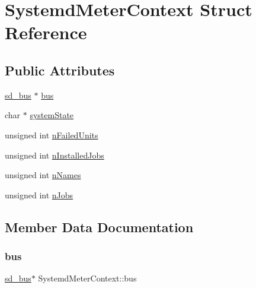 \hypertarget{structSystemdMeterContext}{}\section{Systemd\+Meter\+Context Struct Reference}
\label{structSystemdMeterContext}
\subsection*{Public Attributes}
\begin{DoxyCompactItemize}
\item 
\hyperlink{SystemdMeter_8c_a50445096b835a37bdc1bd416668b969b}{sd\+\_\+bus} $\ast$ \hyperlink{structSystemdMeterContext_acce0c8766cdfc955830c084cc7492b7d}{bus}
\item 
char $\ast$ \hyperlink{structSystemdMeterContext_a2c245fa53d6c43ab07ae7669cc74d065}{system\+State}
\item 
unsigned int \hyperlink{structSystemdMeterContext_ac5422dd52eace15b073840c530a36e3b}{n\+Failed\+Units}
\item 
unsigned int \hyperlink{structSystemdMeterContext_a5636461ff79dd53d069bc2876deb93cf}{n\+Installed\+Jobs}
\item 
unsigned int \hyperlink{structSystemdMeterContext_a7b7c95e236c52f5a3a7a9700cb9cba5f}{n\+Names}
\item 
unsigned int \hyperlink{structSystemdMeterContext_a86efcd76a29742162092d9130a7136e6}{n\+Jobs}
\end{DoxyCompactItemize}


\subsection{Member Data Documentation}
\mbox{\label{structSystemdMeterContext_acce0c8766cdfc955830c084cc7492b7d}} 
\subsubsection{\texorpdfstring{bus}{bus}}
{\footnotesize\ttfamily \hyperlink{SystemdMeter_8c_a50445096b835a37bdc1bd416668b969b}{sd\+\_\+bus}$\ast$ Systemd\+Meter\+Context\+::bus}

\mbox{\label{structSystemdMeterContext_ac5422dd52eace15b073840c530a36e3b}} 
